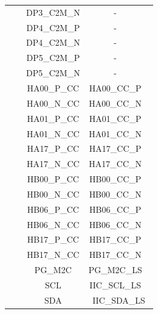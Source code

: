 \documentclass{article}
\begin{document}
\begin{longtable}[l]{|c|c|c|c|}
  & & DP3\_C2M\_N & - \
  \\\cline{3-4}
  & & DP4\_C2M\_P & - \
  \\\cline{3-4}
  & & DP4\_C2M\_N & - \
  \\\cline{3-4}
  & & DP5\_C2M\_P & - \
  \\\cline{3-4}
  & & DP5\_C2M\_N & - \
  \\\cline{3-4}
  & & HA00\_P\_CC & HA00\_CC\_P \
  \\\cline{3-4}
  & & HA00\_N\_CC & HA00\_CC\_N \
  \\\cline{3-4}
  & & HA01\_P\_CC & HA01\_CC\_P \
  \\\cline{3-4}
  & & HA01\_N\_CC & HA01\_CC\_N \
  \\\cline{3-4}
  & & HA17\_P\_CC & HA17\_CC\_P \
  \\\cline{3-4}
  & & HA17\_N\_CC & HA17\_CC\_N \
  \\\cline{3-4}
  & & HB00\_P\_CC & HB00\_CC\_P \
  \\\cline{3-4}
  & & HB00\_N\_CC & HB00\_CC\_N \
  \\\cline{3-4}
  & & HB06\_P\_CC & HB06\_CC\_P \
  \\\cline{3-4}
  & & HB06\_N\_CC & HB06\_CC\_N \
  \\\cline{3-4}
  & & HB17\_P\_CC & HB17\_CC\_P \
  \\\cline{3-4}
  & & HB17\_N\_CC & HB17\_CC\_N \
  \\\cline{3-4}
  & & PG\_M2C & PG\_M2C\_LS \
  \\\cline{3-4}
	& & SCL & IIC\_SCL\_LS \
	\\\cline{3-4}
	& & SDA & IIC\_SDA\_LS \\
	\hline
\end{longtable}
\end{document}
